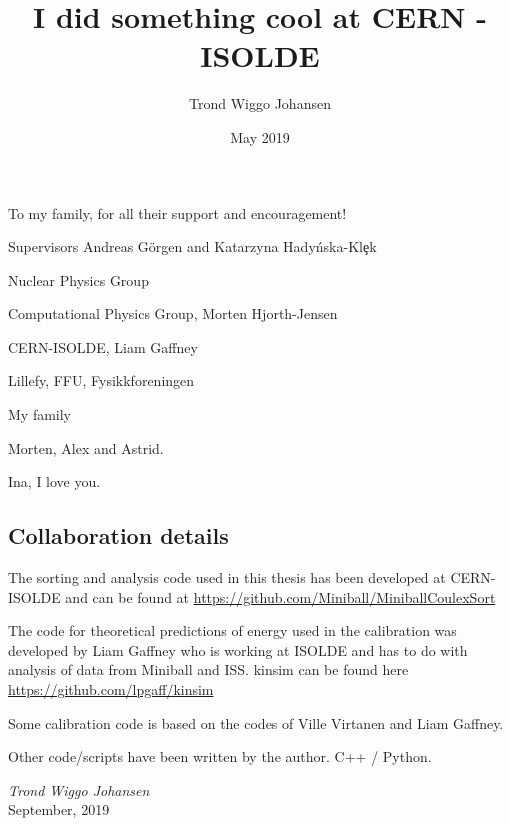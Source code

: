 \documentclass[twoside,english]{uiofysmaster/uiofysmaster}
\author{Trond Wiggo Johansen}
\title{I did something cool at CERN - ISOLDE
}
\date{May 2019}
\begin{document}
\setlength{\belowdisplayskip}{12pt} \setlength{\belowdisplayshortskip}{12pt}
\setlength{\abovedisplayskip}{12pt} \setlength{\abovedisplayshortskip}{12pt}

\maketitle


\begin{abstract}


\end{abstract}


\begin{dedication}
To my family, for all their support and encouragement!

\end{dedication}

\begin{acknowledgements}
Supervisors Andreas Görgen and Katarzyna Hady\'nska-Kl\c ek

Nuclear Physics Group

Computational Physics Group, Morten Hjorth-Jensen

CERN-ISOLDE, Liam Gaffney

Lillefy, FFU, Fysikkforeningen

My family

Morten, Alex and Astrid.

Ina, I love you.

\subsection*{Collaboration details}
The sorting and analysis code used in this thesis has been developed at CERN-ISOLDE and can be found at \url{https://github.com/Miniball/MiniballCoulexSort}

The code for theoretical predictions of energy used in the calibration was developed by Liam Gaffney who is working at ISOLDE and has to do with analysis of data from Miniball and ISS. kinsim can be found here \url{https://github.com/lpgaff/kinsim}

Some calibration code is based on the codes of Ville Virtanen and Liam Gaffney. 

Other code/scripts have been written by the author. C++ / Python.

  \vspace{1.5cm}
  
  \noindent\textit{Trond Wiggo Johansen}\\
  
  \noindent September, 2019
  
\end{acknowledgements}
\end{document}
